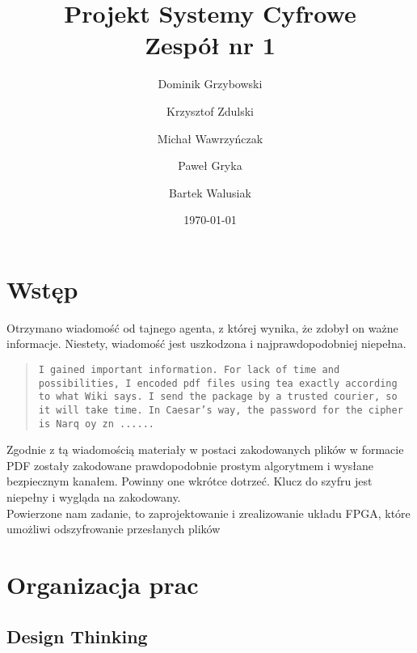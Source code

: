 \documentclass{article}
\title{{\Huge  Projekt Systemy Cyfrowe}\\ {\Large Zespół nr 1} }
\author{Dominik Grzybowski \and  Krzysztof Zdulski \and Michał Wawrzyńczak \and Paweł Gryka \and Bartek Walusiak}
\affil{Politechnika Warszawska, Wydział Elektroniki i Technik Informacyjnych}
\date{\today}
\begin{document}
	
\maketitle
\begin{versionhistory}
\end{versionhistory}


\tableofcontents

\section{Wstęp}
\label{sec:wstep}


Otrzymano wiadomość od tajnego agenta, z której wynika, że zdobył on ważne informacje. Niestety, wiadomość jest uszkodzona i najprawdopodobniej niepełna.

\begin{quote}
\texttt{I gained important information. For lack of time and possibilities, I encoded pdf files using tea exactly according to what Wiki says. I send the package by a trusted courier, so it will take time. In Caesar's way, the password for the cipher is Narq oy zn ...... }
\end{quote}

Zgodnie z tą wiadomością materiały w postaci zakodowanych plików w formacie 
PDF zostały zakodowane prawdopodobnie prostym algorytmem i wysłane bezpiecznym
kanałem. Powinny one wkrótce dotrzeć.
Klucz do szyfru jest niepełny i wygląda na zakodowany.\\
 
Powierzone nam zadanie, to zaprojektowanie i zrealizowanie układu FPGA, które umożliwi odszyfrowanie przesłanych plików


\section{Organizacja prac}
\label{sec:organizacja}



\subsection{Design Thinking}
\label{sec:design_thinking}
\end{document}
